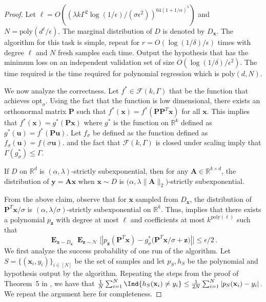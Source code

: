 \documentclass{theoretics}
\newcommand\twonorm[1]{\|#1\|_2}
\renewcommand\vec[1]{\mathbf{#1}}
\DeclareMathOperator*{\E}{\mathbf{E}}
\newcommand{\R}{\mathbb{R}}
\newcommand{\poly}{\mathrm{poly}}
\newcommand{\D}{D}
\newcommand{\1}{\Ind}
\newcommand{\smoothopt}{\mathrm{opt}_{\sigma}}
\newcommand{\x}{\vec x}
\newcommand{\vu}{\vec u}
\newcommand{\z}{\vec z}
\newcommand{\F}{\mathcal{F}}
\newcommand{\Gauss}{\mathcal{N}}
\newcommand{\Dmarginal}{D_{\x}}
\begin{document}
\begin{proof}

Let $\ell=O\left({\left(\lambda k\Gamma^2\log (1/\epsilon)/(\sigma\epsilon^2)\right)^{64(1+1/\alpha)^3}}\right)$ and $N=\poly(d^{\ell}/\epsilon)$. The marginal distribution of $D$ is denoted by $\D_{\x}$. The algorithm for this task is simple, repeat  for $r=O(\log(1/\delta)/\epsilon)$ times with degree $\ell$ and $N$ fresh samples each time. Output the hypothesis that has the minimum loss on an independent validation set of size $O(\log(1/\delta)/\epsilon^2)$. The time required is the time required for polynomial regression which is $\poly(d,N)$. 

We now analyze the correctness. Let $f^*\in \F(k,\Gamma)$ that be the function that achieves $\smoothopt$. Using the fact that the function is low dimensional, there exists an orthonormal matrix $\vec P$ such that $f^*(\x)=f^*(\vec P \vec P^T \x)$ for all $\x$. This implies that $f^*(\x)=g^*(\vec P \x)$ where $g^*$ is the function on $\R^{k}$ defined as $g^*(\vec u)=f^*(\vec P \vec u)$. Let $f_\sigma$ be defined as the function defined as $f_{\sigma}(\vu)=f(\sigma \vu)$.  and the fact that $\F(k,\Gamma)$ is closed under scaling imply that $\Gamma(g^*_\sigma)\leq \Gamma$. 
\begin{lemma}
\label{lem:subexp_scaling}
    If $D$ on $\R^d$ is $(\alpha,\lambda)$-strictly subexponential, then for any $\vec A\in \R^{k\times d}$, the distribution of $\vec y=\vec A\x$ when $\x\sim D$ is $\bigl(\alpha,\lambda\twonorm{\vec A}\bigr)$-strictly subexponential.
\end{lemma}
From the above claim, observe that for $\x$ sampled from $\D_{\x}$, the distribution of $\vec P^T \x/\sigma$ is $(\alpha,\lambda/\sigma)$-strictly subexponential on $\R^k$. Thus,  implies that there exists a polynomial $p_{\z}$ with degree at most  $\ell$ and coefficients at most $k^{\poly(\ell)}$ such that 
    \[
        \E_{\x\sim \Dmarginal}\E_{\z\sim \Gauss}\bigl[|p_\z(\vec P^T \x)-g^*_{\sigma}\bigl(\vec P^T\x/\sigma+ \z\bigr)|\bigr]\leq \epsilon/2\,.
        \]
    We first analyze the success probability of one run of the algorithm. Let $S=\{(\x_i,y_i)\}_{i\in [N]}$ be the set of samples and let $p_S, h_S$ be the polynomial and hypothesis output by the algorithm. Repeating the steps from the proof of Theorem~5 in \cite{KKMS:05}, we have that $\frac{1}{N}\sum_{i=1}^{N} \1\{h_S(\x_i)\neq y_i\}\leq \frac{1}{2N}\sum_{i=1}^{N}|p_S(\x_i)-y_i|$. We repeat the argument here for completeness. 

\end{proof}
\end{document}
